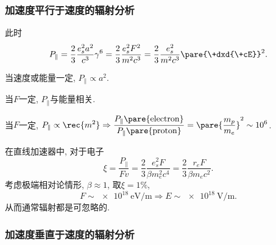\documentclass[hidelinks]{ctexart}
\begin{document}

\subsubsection{加速度平行于速度的辐射分析} %
\label{ssub:加速度平行于速度的辐射分析}

此时
\[ P_\parallel = \frac{2}{3}\frac{e_s^2 a^2}{c^3}\gamma^6 = \frac{2}{3}\frac{e_s^2 F^2}{m^2c^3} = \frac{2}{3}\frac{e_s^2}{m^2c^3}\pare{\+dxd{\+cE}}^2. \]
\begin{cenum}
    \item 当速度或能量一定, $P_\parallel \propto a^2$.
    \item 当$F$一定, $P_\parallel$与能量相关.
    \item 当$F$一定, $\displaystyle P_\parallel \propto \rec{m^2} \Rightarrow \frac{P_\parallel\pare{\mathrm{electron}}}{P_\parallel\pare{\mathrm{proton}}} = \pare{\frac{m_p}{m_e}}^2 \sim 10^6$.
    \item 在直线加速器中, 对于电子
    \[ \xi = \frac{P_\parallel}{Fv} = \frac{2}{3}\frac{e_s^2 F}{\beta m_e^2 c^4} = \frac{2}{3}\frac{r_e F}{\beta m_e c^2}. \]
    考虑极端相对论情形, $\beta \approx 1$, 取$\xi = 1\%$,
    \[ F \sim \SI{e18}{\eV\per\meter} \Rightarrow E\sim \SI{e18}{\volt\per\meter}. \]
    从而通常辐射都是可忽略的.
\end{cenum}


\subsubsection{加速度垂直于速度的辐射分析} %
\label{ssub:加速度垂直于速度的辐射分析}
\end{document}
